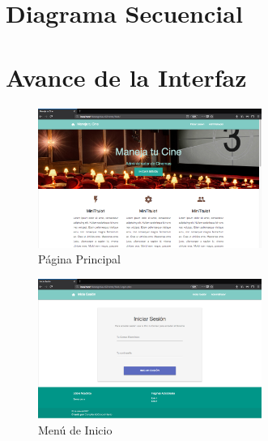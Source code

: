 \documentclass[12pt, fleqn]{report}                             %
\begin{document}
    \clearpage
    \section{Diagrama Secuencial}

        


    \clearpage
    \section{Avance de la Interfaz}

        \begin{figure}[ht]
            \centering
            \includegraphics[width=0.65\textwidth]{EjemploInterfazSegundaParte1}
            \caption{Página Principal}
        \end{figure}


        \begin{figure}[ht]
            \centering
            \includegraphics[width=0.65\textwidth]{EjemploInterfazSegundaParte2}
            \caption{Menú de Inicio}
        \end{figure}
\end{document}
